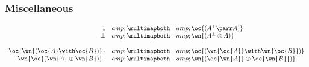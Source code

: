 \subsubsection{Miscellaneous}\label{miscellaneous}

\(\begin{array}{rcl}
  \one &amp;\linequiv&amp; \oc{(A\orth\parr A)} \\
  \bot &amp;\linequiv&amp; \wn{(A\orth\tens A)} \\
\\
  \oc{\wn{(\oc{A}\with\oc{B})}} &amp;\linequiv&amp; \oc{(\wn{\oc{A}}\with\wn{\oc{B}})} \\
  \wn{\oc{(\wn{A}\plus\wn{B})}} &amp;\linequiv&amp; \wn{(\oc{\wn{A}}\plus\oc{\wn{B}})}
\end{array}\)


